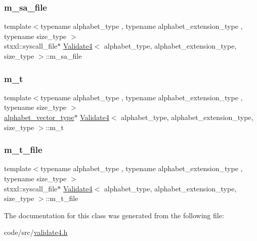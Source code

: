 \mbox{\label{class_validate4_a32bf87f5aa8dc5fda81440f23ce0cb45}} 
\subsubsection{\texorpdfstring{m\+\_\+sa\+\_\+file}{m\_sa\_file}}
{\footnotesize\ttfamily template$<$typename alphabet\+\_\+type , typename alphabet\+\_\+extension\+\_\+type , typename size\+\_\+type $>$ \\
stxxl\+::syscall\+\_\+file$\ast$ \hyperlink{class_validate4}{Validate4}$<$ alphabet\+\_\+type, alphabet\+\_\+extension\+\_\+type, size\+\_\+type $>$\+::m\+\_\+sa\+\_\+file\hspace{0.3cm}{\ttfamily [private]}}

\mbox{\label{class_validate4_a421635668138c3d4cbe2b7c362d57006}} 
\subsubsection{\texorpdfstring{m\+\_\+t}{m\_t}}
{\footnotesize\ttfamily template$<$typename alphabet\+\_\+type , typename alphabet\+\_\+extension\+\_\+type , typename size\+\_\+type $>$ \\
\hyperlink{class_validate4_a49c80b3d101be19542a4341c2387603a}{alphabet\+\_\+vector\+\_\+type}$\ast$ \hyperlink{class_validate4}{Validate4}$<$ alphabet\+\_\+type, alphabet\+\_\+extension\+\_\+type, size\+\_\+type $>$\+::m\+\_\+t\hspace{0.3cm}{\ttfamily [private]}}

\mbox{\label{class_validate4_a63b517772b6359b72cf1c1a4ad5f14b5}} 
\subsubsection{\texorpdfstring{m\+\_\+t\+\_\+file}{m\_t\_file}}
{\footnotesize\ttfamily template$<$typename alphabet\+\_\+type , typename alphabet\+\_\+extension\+\_\+type , typename size\+\_\+type $>$ \\
stxxl\+::syscall\+\_\+file$\ast$ \hyperlink{class_validate4}{Validate4}$<$ alphabet\+\_\+type, alphabet\+\_\+extension\+\_\+type, size\+\_\+type $>$\+::m\+\_\+t\+\_\+file\hspace{0.3cm}{\ttfamily [private]}}



The documentation for this class was generated from the following file\+:\begin{DoxyCompactItemize}
\item 
code/src/\hyperlink{validate4_8h}{validate4.\+h}\end{DoxyCompactItemize}
